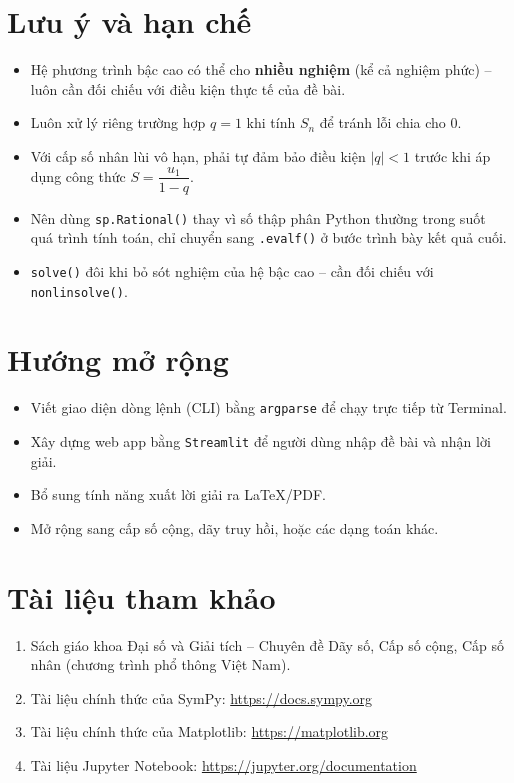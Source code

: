 \documentclass[12pt,a4paper]{report}
\begin{document}
\section*{Lưu ý và hạn chế}

\begin{itemize}
  \item Hệ phương trình bậc cao có thể cho \textbf{nhiều nghiệm} (kể cả
  nghiệm phức) -- luôn cần đối chiếu với điều kiện thực tế của đề bài.
  \item Luôn xử lý riêng trường hợp $q = 1$ khi tính $S_n$ để tránh lỗi
  chia cho 0.
  \item Với cấp số nhân lùi vô hạn, phải tự đảm bảo điều kiện $|q| < 1$
  trước khi áp dụng công thức $S = \dfrac{u_1}{1-q}$.
  \item Nên dùng \texttt{sp.Rational()} thay vì số thập phân Python
  thường trong suốt quá trình tính toán, chỉ chuyển sang
  \texttt{.evalf()} ở bước trình bày kết quả cuối.
  \item \texttt{solve()} đôi khi bỏ sót nghiệm của hệ bậc cao -- cần
  đối chiếu với \texttt{nonlinsolve()}.
\end{itemize}

\section*{Hướng mở rộng}

\begin{itemize}
  \item Viết giao diện dòng lệnh (CLI) bằng \texttt{argparse} để chạy
  trực tiếp từ Terminal.
  \item Xây dựng web app bằng \texttt{Streamlit} để người dùng nhập đề
  bài và nhận lời giải.
  \item Bổ sung tính năng xuất lời giải ra LaTeX/PDF.
  \item Mở rộng sang cấp số cộng, dãy truy hồi, hoặc các dạng toán khác.
\end{itemize}

\section*{Tài liệu tham khảo}

\begin{enumerate}
  \item Sách giáo khoa Đại số và Giải tích -- Chuyên đề Dãy số, Cấp số
  cộng, Cấp số nhân (chương trình phổ thông Việt Nam).
  \item Tài liệu chính thức của SymPy: \url{https://docs.sympy.org}
  \item Tài liệu chính thức của Matplotlib: \url{https://matplotlib.org}
  \item Tài liệu Jupyter Notebook: \url{https://jupyter.org/documentation}
\end{enumerate}
\end{document}
